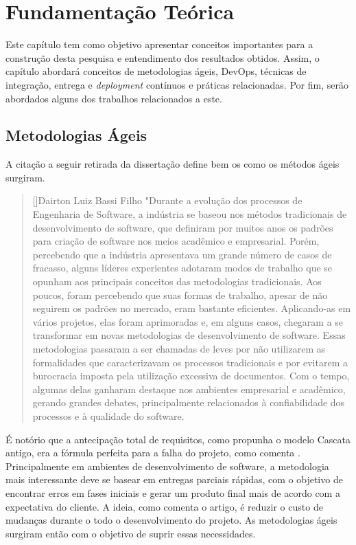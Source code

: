 \chapter{Fundamentação Teórica}

Este capítulo tem como objetivo apresentar conceitos importantes para a
construção desta pesquisa e entendimento dos resultados obtidos. Assim, o capítulo abordará conceitos de metodologias ágeis, DevOps, técnicas de integração, entrega e \emph{deployment} contínuos e práticas relacionadas. Por fim, serão abordados alguns dos trabalhos relacionados a este.


\section{Metodologias Ágeis}

A citação a seguir retirada da dissertação \cite{experienciaComAgil} define bem os como os métodos ágeis surgiram.

    
\begin{quotation}[]{Dairton Luiz Bassi Filho}
    "Durante a evolução dos processos de Engenharia de Software, a
indústria se baseou nos métodos tradicionais de desenvolvimento de
software, que definiram por muitos anos os padrões para criação de
software nos meios acadêmico e empresarial. Porém, percebendo que a
indústria apresentava um grande número de casos de fracasso, alguns
líderes experientes adotaram modos de trabalho que se opunham aos
principais conceitos das metodologias tradicionais. Aos poucos, foram
percebendo que suas formas de trabalho, apesar de não seguirem os
padrões no mercado, eram bastante eficientes. Aplicando-as em vários 
projetos, elas foram aprimoradas e, em alguns casos, chegaram a se
transformar em novas metodologias de desenvolvimento de software.
Essas metodologias passaram a ser chamadas de leves por não
utilizarem as formalidades que caracterizavam os processos tradicionais
e por evitarem a burocracia imposta pela utilização excessiva de
documentos. Com o tempo, algumas delas ganharam destaque nos
ambientes empresarial e acadêmico, gerando grandes debates,
principalmente relacionados à confiabilidade dos processos e à
qualidade do software.
\end{quotation}

É notório que a antecipação total de requisitos, como propunha o modelo Cascata antigo, era a fórmula perfeita para a falha do projeto, como comenta \cite{agileSoftwareDevelopment}. Principalmente em ambientes de desenvolvimento de software, a metodologia mais interessante deve se basear em entregas parciais rápidas, com o objetivo de encontrar erros em fases iniciais e gerar um produto final mais de acordo com a expectativa do cliente. A ideia, como comenta o artigo, é reduzir o custo de mudanças durante o todo o desenvolvimento do projeto. As metodologias ágeis surgiram então com o objetivo de suprir essas necessidades.

